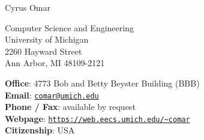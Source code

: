 \documentclass[10pt,letterpaper]{article}
\def\name{Cyrus Omar}
\renewenvironment{itemize}{
  \begin{list}{}{
    \setlength{\leftmargin}{1.25em}
    \setlength{\itemsep}{0.25em}
    \setlength{\parskip}{0pt}
    \setlength{\parsep}{0.2em}
  }
}{
  \end{list}
}
\begin{document}
{\LARGE \name}


\bigskip

\begin{minipage}[t]{0.495\textwidth}
  Computer Science and Engineering\\
  University of Michigan\\
  2260 Hayward Street\\
  Ann Arbor, MI 48109-2121 
\end{minipage}
\begin{minipage}[t]{0.495\textwidth}
  \textbf{Office}: 4773 Bob and Betty Beyster Building (BBB) \\
  \textbf{Email}: \href{mailto:comar@umich.edu}{\texttt{comar@umich.edu}} \\
  \textbf{Phone / Fax}: available by request\\
  \textbf{Webpage}: \href{http://people.cs.uchicago.edu/~comar}{\texttt{https://web.eecs.umich.edu/\textasciitilde comar}} \\
  \textbf{Citizenship}: USA
\end{minipage}


\end{document}
